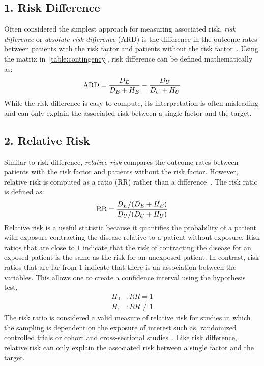 \subsection{1. Risk Difference}\label{subsec:associated-risk-difference}
Often considered the simplest approach for measuring associated risk, \emph{risk difference} or \emph{absolute risk difference} (ARD) is the difference in the outcome rates between patients with the risk factor and patients without the risk factor~\citep{Statistical-hypothesis-testing}.
Using the matrix in~\ref{table:contingency}, risk difference can be defined mathematically as:
\begin{align*}
 \text{ARD} = \frac{D_{E}}{D_{E} + H_{E}} - \frac{D_{U}}{D_{U} + H_{U}}
\end{align*}
While the risk difference is easy to compute, its interpretation is often misleading and can only explain the associated risk between a single factor and the target.

\subsection{2. Relative Risk}\label{subsec:relative-risk}
Similar to risk difference, \emph{relative risk} compares the outcome rates between patients with the risk factor and patients without the risk factor.
However, relative risk is computed as a ratio (RR) rather than a difference~\citep{Statistical-hypothesis-testing}.
The risk ratio is defined as:
\begin{align*}
 \text{RR} = \frac{D_{E} / (D_{E} + H_{E})}{D_{U} / (D_{U} + H_{U})}
\end{align*}
Relative risk is a useful statistic because it quantifies the probability of a patient with exposure contracting the disease relative to a patient without exposure.
Risk ratios that are close to $1$ indicate that the risk of contracting the disease for an exposed patient is the same as the risk for an unexposed patient.
In contrast, risk ratios that are far from $1$ indicate that there is an association between the variables.
This allows one to create a confidence interval using the hypothesis test,
\begin{align*}
    H_0&: RR = 1 \\
    H_1&: RR \neq 1
\end{align*}
The risk ratio is considered a valid measure of relative risk for studies in which the sampling is dependent on the exposure of interest such as, randomized controlled trials or cohort and cross-sectional studies~\citep{Relative-Measures-of-Association-for-Binary-Outcomes}.
Like risk difference, relative risk can only explain the associated risk between a single factor and the target.


